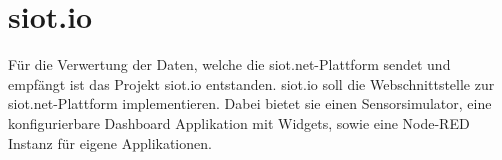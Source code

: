 \section{siot.io}
Für die Verwertung der Daten, welche die siot.net-Plattform sendet und empfängt ist das Projekt siot.io entstanden. siot.io soll die Webschnittstelle zur siot.net-Plattform implementieren. Dabei bietet sie einen Sensorsimulator, eine konfigurierbare Dashboard Applikation mit Widgets, sowie eine Node-RED Instanz für eigene Applikationen.
